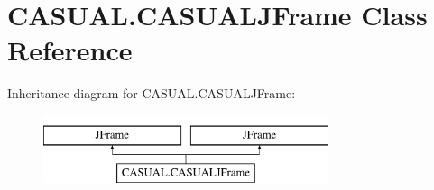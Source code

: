 \hypertarget{classCASUAL_1_1CASUALJFrame}{\section{C\-A\-S\-U\-A\-L.\-C\-A\-S\-U\-A\-L\-J\-Frame Class Reference}
\label{classCASUAL_1_1CASUALJFrame}
}
Inheritance diagram for C\-A\-S\-U\-A\-L.\-C\-A\-S\-U\-A\-L\-J\-Frame\-:\begin{figure}[H]
\begin{center}
\leavevmode
\includegraphics[height=2.000000cm]{classCASUAL_1_1CASUALJFrame}
\end{center}
\end{figure}
